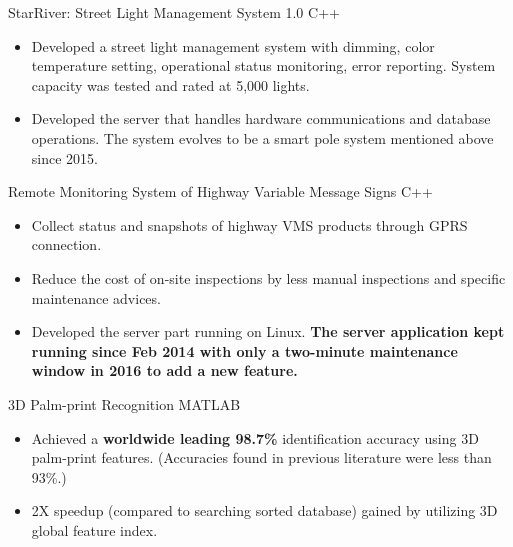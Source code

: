 \documentclass[11pt,a4paper]{moderncv/moderncv}
\begin{document}
{StarRiver: Street Light Management System 1.0}
{C++}
{}{}
{
\begin{itemize}
	\item Developed a street light management system with dimming, color temperature setting, operational status monitoring, error reporting. System capacity was tested and rated at 5,000 lights.
	\item Developed the server that handles hardware communications and database operations. The system evolves to be a smart pole system mentioned above since 2015.
\end{itemize}
}

{Remote Monitoring System of Highway Variable Message Signs}
{C++}
{}{}
{
\begin{itemize}
	\item Collect status and snapshots of highway VMS products through GPRS connection.
	\item Reduce the cost of on-site inspections by less manual inspections and  specific maintenance advices.
	\item Developed the server part running on Linux. \textbf{The server application kept running since Feb 2014 with only a two-minute maintenance window in 2016 to add a new feature.}
\end{itemize}
}

%
%

{3D Palm-print Recognition}
{MATLAB}
{}{}
{
\begin{itemize}
	\item Achieved a \textbf{worldwide leading 98.7\%} identification accuracy using 3D palm-print features. (Accuracies found in previous literature were less than 93\%.)
	\item 2X speedup (compared to searching sorted database) gained by utilizing 3D global feature index.
\end{itemize}
}
\end{document}
